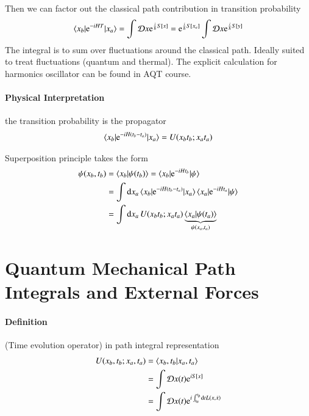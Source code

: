 Then we can factor out the classical path contribution in transition probability
\begin{align*}
   \braket{ x_b | \mathrm{e}^{-iHT} | x_a } = \int \mathcal{D}x \mathrm{e}^{\frac{i}{\hbar} S[x]} =  \mathrm{e}^{\frac{i}{\hbar} S[x_a]} \int \mathcal{D}x \mathrm{e}^{\frac{i}{\hbar} S[y]}
\end{align*}
The integral is to sum over fluctuations around the classical path. Ideally suited to treat fluctuations (quantum and thermal). The explicit calculation for harmonics oscillator can be found in AQT course.

\paragraph{Physical Interpretation} the transition probability is the propagator
\begin{align}
   \braket{x_b | \mathrm{e}^{-iH(t_b - t_a)} | x_a} = U (x_b t_b; x_a t_a)
\end{align}

Superposition principle takes the form
\begin{align*}
   \psi(x_b, t_b) &= \braket{x_b | \psi(t_b) } = \braket{x_b | \mathrm{e}^{-iHt_b} | \psi} \\
                  &= \int \dd{x_a} \braket{x_b | \mathrm{e}^{-iH(t_b - t_a)}| x_a } \braket{x_a| \mathrm{e}^{-iHt_a} | \psi} \\
                  &= \int \dd{x_a} U(x_b t_b; x_a t_a) \underbrace{\braket{x_a | \psi(t_a)}}_{\psi(x_a, t_a)} \\
\end{align*}

\section{Quantum Mechanical Path Integrals and External Forces}
\paragraph{Definition} (Time evolution operator) in path integral representation
\begin{align}
   U(x_b, t_b; x_a, t_a) &= \braket{x_b, t_b | x_a, t_a}\\
                       &= \int \mathcal{D} x(t) \mathrm{e}^{iS[x]} \notag \\
                       &= \int \mathcal{D} x(t) \mathrm{e}^{i\int^{t_b}_{t_a} \dd{t} L(x, \dot{x})} \notag
\end{align}

